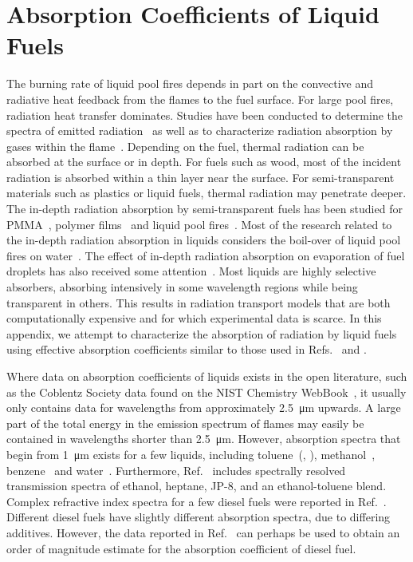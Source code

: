 \chapter{Absorption Coefficients of Liquid Fuels}
\label{app_abscoeff}

The burning rate of liquid pool fires depends in part on the convective and radiative heat feedback from the flames to the fuel surface. For large pool fires, radiation heat transfer dominates. Studies have been conducted to determine the spectra of emitted radiation~\cite{Suo-Anttila:PCT2009} as well as to characterize radiation absorption by gases within the flame~\cite{Wakatsuki:CST2008}. Depending on the fuel, thermal radiation can be absorbed at the surface or in depth. For fuels such as wood, most of the incident radiation is absorbed within a thin layer near the surface. For semi-transparent materials such as plastics or liquid fuels, thermal radiation may penetrate deeper. The in-depth radiation absorption by semi-transparent fuels has been studied for PMMA~\cite{Stoliarov:CF2009}, polymer films~\cite{Tsilingiris:ECM2003} and liquid pool fires~\cite{Suo-Anttila:PCT2009}. Most of the research related to the in-depth radiation absorption in liquids considers the boil-over of liquid pool fires on water~\cite{Broeckmann:JLPPI1995}. The effect of in-depth radiation absorption on evaporation of fuel droplets has also received some attention~\cite{Sazhin:IJHMT2004b}. Most liquids are highly selective absorbers, absorbing intensively in some wavelength regions while being transparent in others. This results in radiation transport models that are both computationally expensive and for which experimental data is scarce. In this appendix, we attempt to characterize the absorption of radiation by liquid fuels using effective absorption coefficients similar to those used in Refs.~\cite{Madhav:IJMP1995} and \cite{Manohar:JHT1995}.

Where data on absorption coefficients of liquids exists in the open literature, such as the Coblentz Society data found on the NIST Chemistry WebBook~\cite{Coblentz:1}, it usually  only contains data for wavelengths from approximately \SI{2.5}{\micro m} upwards. A large part of the total energy in the emission spectrum of flames may easily be contained in wavelengths shorter than \SI{2.5}{\micro m}. However, absorption spectra that begin from \SI{1}{\micro m} exists for a few liquids, including toluene~(\cite{Bertie:JMS2005}, \cite{Bertie:AS1994a}), methanol~\cite{Bertie:AS1993a}, benzene~\cite{Bertie:AS1993b} and water~\cite{Bertie:AS1996}. Furthermore, Ref.~\cite{Suo-Anttila:PCT2009} includes spectrally resolved transmission spectra of ethanol, heptane, JP-8, and an ethanol-toluene blend. Complex refractive index spectra for a few diesel fuels were reported in Ref.~\cite{Sazhin:IJHMT2004b}. Different diesel fuels have slightly different absorption spectra, due to differing additives. However, the data reported in Ref.~\cite{Sazhin:IJHMT2004b} can perhaps be used to obtain an order of magnitude estimate for the absorption coefficient of diesel fuel.


